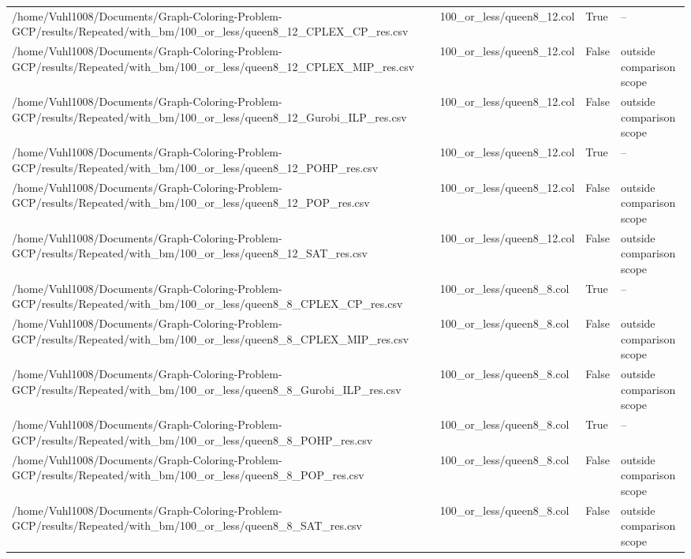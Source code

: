 \begin{table}[htbp]
\begin{tabular}{llll}
/home/Vuhl1008/Documents/Graph-Coloring-Problem-GCP/results/Repeated/with\_bm/100\_or\_less/queen8\_12\_CPLEX\_CP\_res.csv & 100\_or\_less/queen8\_12.col & True & -- \\
/home/Vuhl1008/Documents/Graph-Coloring-Problem-GCP/results/Repeated/with\_bm/100\_or\_less/queen8\_12\_CPLEX\_MIP\_res.csv & 100\_or\_less/queen8\_12.col & False & outside comparison scope \\
/home/Vuhl1008/Documents/Graph-Coloring-Problem-GCP/results/Repeated/with\_bm/100\_or\_less/queen8\_12\_Gurobi\_ILP\_res.csv & 100\_or\_less/queen8\_12.col & False & outside comparison scope \\
/home/Vuhl1008/Documents/Graph-Coloring-Problem-GCP/results/Repeated/with\_bm/100\_or\_less/queen8\_12\_POHP\_res.csv & 100\_or\_less/queen8\_12.col & True & -- \\
/home/Vuhl1008/Documents/Graph-Coloring-Problem-GCP/results/Repeated/with\_bm/100\_or\_less/queen8\_12\_POP\_res.csv & 100\_or\_less/queen8\_12.col & False & outside comparison scope \\
/home/Vuhl1008/Documents/Graph-Coloring-Problem-GCP/results/Repeated/with\_bm/100\_or\_less/queen8\_12\_SAT\_res.csv & 100\_or\_less/queen8\_12.col & False & outside comparison scope \\
/home/Vuhl1008/Documents/Graph-Coloring-Problem-GCP/results/Repeated/with\_bm/100\_or\_less/queen8\_8\_CPLEX\_CP\_res.csv & 100\_or\_less/queen8\_8.col & True & -- \\
/home/Vuhl1008/Documents/Graph-Coloring-Problem-GCP/results/Repeated/with\_bm/100\_or\_less/queen8\_8\_CPLEX\_MIP\_res.csv & 100\_or\_less/queen8\_8.col & False & outside comparison scope \\
/home/Vuhl1008/Documents/Graph-Coloring-Problem-GCP/results/Repeated/with\_bm/100\_or\_less/queen8\_8\_Gurobi\_ILP\_res.csv & 100\_or\_less/queen8\_8.col & False & outside comparison scope \\
/home/Vuhl1008/Documents/Graph-Coloring-Problem-GCP/results/Repeated/with\_bm/100\_or\_less/queen8\_8\_POHP\_res.csv & 100\_or\_less/queen8\_8.col & True & -- \\
/home/Vuhl1008/Documents/Graph-Coloring-Problem-GCP/results/Repeated/with\_bm/100\_or\_less/queen8\_8\_POP\_res.csv & 100\_or\_less/queen8\_8.col & False & outside comparison scope \\
/home/Vuhl1008/Documents/Graph-Coloring-Problem-GCP/results/Repeated/with\_bm/100\_or\_less/queen8\_8\_SAT\_res.csv & 100\_or\_less/queen8\_8.col & False & outside comparison scope \\

\end{tabular}
\end{table}
